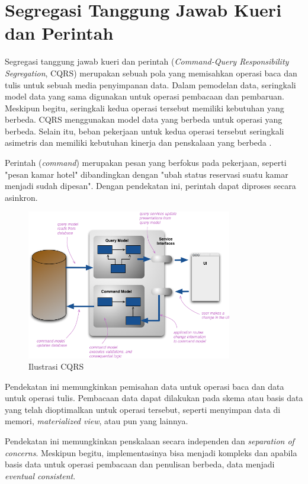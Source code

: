 \section{Segregasi Tanggung Jawab Kueri dan Perintah}

Segregasi tanggung jawab kueri dan perintah (\textit{Command-Query Responsibility Segregation}, CQRS) merupakan sebuah pola yang memisahkan operasi baca dan tulis untuk sebuah media penyimpanan data. Dalam pemodelan data, seringkali model data yang sama digunakan untuk operasi pembacaan dan pembaruan. Meskipun begitu, seringkali kedua operasi tersebut memiliki kebutuhan yang berbeda. CQRS menggunakan model data yang berbeda untuk operasi yang berbeda. Selain itu, beban pekerjaan untuk kedua operasi tersebut seringkali asimetris dan memiliki kebutuhan kinerja dan penskalaan yang berbeda \parencite{msCQRS}.

Perintah (\textit{command}) merupakan pesan yang berfokus pada pekerjaan, seperti "pesan kamar hotel" dibandingkan dengan "ubah status reservasi suatu kamar menjadi sudah dipesan". Dengan pendekatan ini, perintah dapat diproses secara asinkron.

\begin{figure}[htbp]
    \centering
    \includegraphics[width=0.8\textwidth]{resources/chapter-2/cqrs.png}
    \caption{Ilustrasi CQRS \parencite{fwCQRS}}
    \label{fig:cqrs-illustration}
\end{figure}

Pendekatan ini memungkinkan pemisahan data untuk operasi baca dan data untuk operasi tulis. Pembacaan data dapat dilakukan pada skema atau basis data yang telah dioptimalkan untuk operasi tersebut, seperti menyimpan data di memori, \textit{materialized view}, atau pun yang lainnya.

Pendekatan ini memungkinkan penskalaan secara independen dan \textit{separation of concerns}. Meskipun begitu, implementasinya bisa menjadi kompleks dan apabila basis data untuk operasi pembacaan dan penulisan berbeda, data menjadi \textit{eventual consistent}.